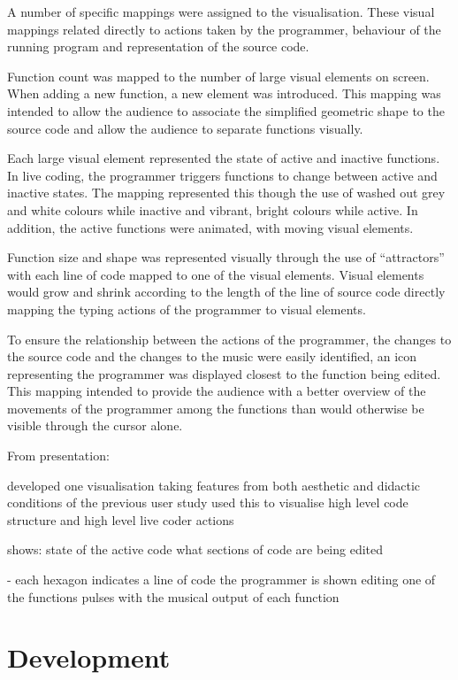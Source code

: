 A number of specific mappings were assigned to the visualisation. These visual mappings related directly to actions taken by the programmer, behaviour of the running program and representation of the source code. 

Function count was mapped to the number of large visual elements on screen. When adding a new function, a new element was introduced. This mapping was intended to allow the audience to associate the simplified geometric shape to the source code and allow the audience to separate functions visually.

Each large visual element represented the state of active and inactive functions. In live coding, the programmer triggers functions to change between active and inactive states. The mapping represented this though the use of washed out grey and white colours while inactive and vibrant, bright colours while active. In addition, the active functions were animated, with moving visual elements.

Function size and shape was represented visually through the use of ``attractors'' with each line of code mapped to one of the visual elements. Visual elements would grow and shrink according to the length of the line of source code directly mapping the typing actions of the programmer to visual elements.  


To ensure the relationship between the actions of the programmer, the changes to the source code and the changes to the music were easily identified, an icon representing the programmer was displayed closest to the function being edited. This mapping intended to provide the audience with a better overview of the movements of the programmer among the functions than would otherwise be visible through the cursor alone.  

From presentation:

developed one visualisation taking features from both aesthetic and didactic conditions of the previous user study
used this to visualise high level code structure and high level live coder actions

shows:
state of the active code
what sections of code are being edited

-  each hexagon indicates a line of code
the programmer is shown editing one of the functions
pulses with the musical output of each function

\section{Development}

